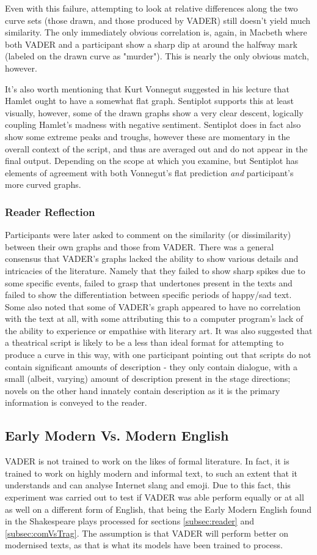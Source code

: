 \documentclass[a4paper]{article}
\begin{document}
            Even with this failure, attempting to look at relative differences along the two curve sets (those drawn, and those produced by VADER) still doesn't yield much similarity. The only immediately obvious correlation is, again, in Macbeth where both VADER and a participant show a sharp dip at around the halfway mark (labeled on the drawn curve as "murder"). This is nearly the only obvious match, however.
            
            It's also worth mentioning that Kurt Vonnegut suggested in his lecture that Hamlet ought to have a somewhat flat graph. Sentiplot supports this at least visually, however, some of the drawn graphs show a very clear descent, logically coupling Hamlet's madness with negative sentiment. Sentiplot does in fact also show some extreme peaks and troughs, however these are momentary in the overall context of the script, and thus are averaged out and do not appear in the final output. Depending on the scope at which you examine, but Sentiplot has elements of agreement with both Vonnegut's flat prediction \textit{and} participant's more curved graphs.
			\subsubsection{Reader Reflection}
				Participants were later asked to comment on the similarity (or dissimilarity) between their own graphs and those from VADER. There was a general consensus that VADER's graphs lacked the ability to show various details and intricacies of the literature. Namely that they failed to show sharp spikes due to some specific events, failed to grasp that undertones present in the texts and failed to show the differentiation between specific periods of happy/sad text. Some also noted that some of VADER's graph appeared to have no correlation with the text at all, with some attributing this to a computer program's lack of the ability to experience or empathise with literary art. It was also suggested that a theatrical script is likely to be a less than ideal format for attempting to produce a curve in this way, with one participant pointing out that scripts do not contain significant amounts of description - they only contain dialogue, with a small (albeit, varying) amount of description present in the stage directions; novels on the other hand innately contain description as it is the primary information is conveyed to the reader.
    \subsection{Early Modern Vs. Modern English}
        VADER is not trained to work on the likes of formal literature. In fact, it is trained to work on highly modern and informal text, to such an extent that it understands and can analyse Internet slang and emoji. Due to this fact, this experiment was carried out to test if VADER was able perform equally or at all as well on a different form of English, that being the Early Modern English found in the Shakespeare plays processed for sections \ref{subsec:reader} and \ref{subsec:comVsTrag}. The assumption is that VADER will perform better on modernised texts, as that is what its models have been trained to process.
        
\end{document}
